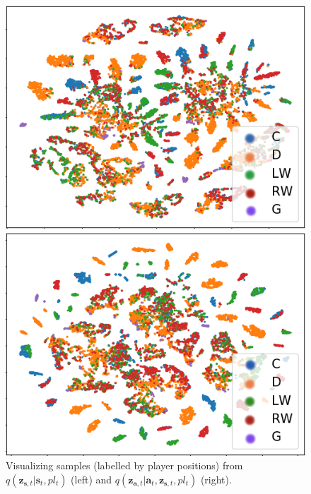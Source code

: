 \documentclass[letterpaper]{article} %
\newcommand{\latentvariables}{\mathbf{z}}
\newcommand{\state}{\mathbf{s}}
\newcommand{\action}{\mathbf{a}}
\newcommand{\player}{pl}
\begin{document}
\begin{figure}[htbp]
    \begin{minipage}[b]{.5\columnwidth}
    \centering
        \includegraphics[width=0.95\columnwidth]{figures/player_enc_z_cluster5_cvrnn_3901_state_position.png}
    \end{minipage}%
    \begin{minipage}[b]{.5\columnwidth}
    \centering
        \includegraphics[width=0.95\columnwidth]{figures/player_enc_z_cluster5_cvrnn_3901_state_action_position.png}
    \end{minipage}%
    \caption{Visualizing samples (labelled by player positions) from $q(\latentvariables_{\state,t}|\state_{t},\player_{t})$ (left) and $q(\latentvariables_{\action,t}|\action_{t},\latentvariables_{\state,t}, \player_{t})$ (right).}
    \label{fig:layer-visualization}
    \vspace{-0.2in}
\end{figure}
\end{document}
